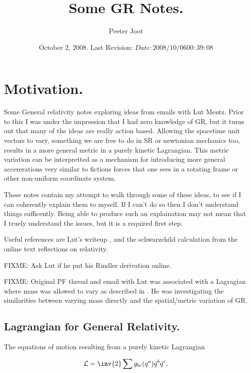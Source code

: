 \documentclass{article}      %
\title{ Some GR Notes. } %
\author{Peeter Joot}         %
\date{ October 2, 2008.  Last Revision: $Date: 2008/10/06 00:39:08 $ } %
\newcommand{\LL}[0]{\mathcal{L}}
\newcommand{\qdot}[0]{\dot{q}}
\begin{document}

\maketitle{}

\tableofcontents

\section{ Motivation. }

Some General relativity notes exploring ideas from emails with Lut Mentz.
Prior to this I was under the impression that I had zero knowledge of GR,
but it turns out that many of the ideas are really action based. 
Allowing the spacetime unit vectors to vary, something we are free to
do in SR or newtonian mechanics too, results in a more 
general metric in a purely kinetic Lagrangian.  This metric variation
can be interpretted as a mechanism for introducing more general
accererations very similar to fictious forces that one sees in a
rotating frame or other non-uniform coordinate system.

These notes contain my attempt to walk through some of these ideas, to see
if I can coherently explain them to myself.  If I can't do so then I don't
understand things sufficently.  Being able to produce such an explaination
may not mean that I truely understand the issues, but it is a required
first step.

Useful references are Lut's writeup \cite{lutSchwarzChildRadial}, 
and the schwarzchild calculation \cite{mathpagesSchwarzChildRadial}
from the online text reflections on relativity.

FIXME: Ask Lut if he put his Rindler derivation online.

FIXME: Original PF thread and email with Lut was associated with 
a Lagragian where mass was allowed to vary as described in \cite{PJMassVary}.  He was
investigating the similarities between varying mass directly and the spatial/metric
variation of GR.

\subsection{ Lagrangian for General Relativity. }

The equations of motion resulting from a purely kinetic Lagrangian

\begin{equation}\label{eqn:keLagrangian}
\LL = \inv{2} \sum  g_{b c}(q^a) \qdot^b \qdot^c,
\end{equation}
\end{document}
